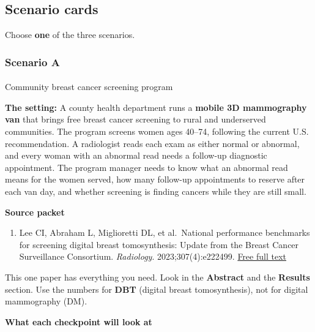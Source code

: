 \documentclass[
  letterpaper,
  DIV=11,
  numbers=noendperiod]{scrartcl}
\makeatletter
\let\oldparagraph\paragraph
\renewcommand{\paragraph}{
    \@ifstar
      \xxxParagraphStar
      \xxxParagraphNoStar
  }
\newcommand{\xxxParagraphStar}[1]{\oldparagraph*{#1}\mbox{}}
\newcommand{\xxxParagraphNoStar}[1]{\oldparagraph{#1}\mbox{}}
\providecommand{\tightlist}{%
  \setlength{\itemsep}{0pt}\setlength{\parskip}{0pt}}
\makeatother
\begin{document}
\begin{tcolorbox}
\end{tcolorbox}

\subsection{Scenario cards}\label{scenario-cards}

Choose \textbf{one} of the three scenarios.

\subsubsection{Scenario A}

\paragraph{Community breast cancer screening
program}\label{community-breast-cancer-screening-program}

\textbf{The setting:} A county health department runs a \textbf{mobile
3D mammography van} that brings free breast cancer screening to rural
and underserved communities. The program screens women ages 40--74,
following the current U.S. recommendation. A radiologist reads each exam
as either normal or abnormal, and every woman with an abnormal read
needs a follow-up diagnostic appointment. The program manager needs to
know what an abnormal read means for the women served, how many
follow-up appointments to reserve after each van day, and whether
screening is finding cancers while they are still small.

\textbf{Source packet}

\begin{enumerate}
\def\labelenumi{\arabic{enumi}.}
\tightlist
\item
  Lee CI, Abraham L, Miglioretti DL, et al.~National performance
  benchmarks for screening digital breast tomosynthesis: Update from the
  Breast Cancer Surveillance Consortium. \emph{Radiology}.
  2023;307(4):e222499.
  \href{https://pmc.ncbi.nlm.nih.gov/articles/PMC10323294/}{Free full
  text}
\end{enumerate}

This one paper has everything you need. Look in the \textbf{Abstract}
and the \textbf{Results} section. Use the numbers for \textbf{DBT}
(digital breast tomosynthesis), not for digital mammography (DM).

\textbf{What each checkpoint will look at}
\end{document}
